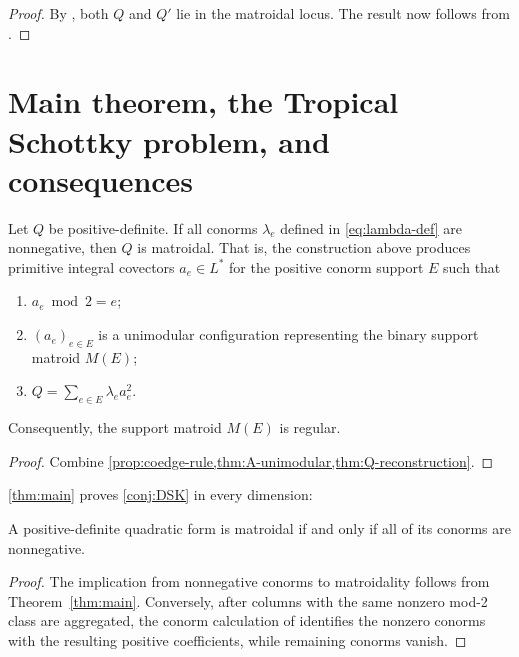 \documentclass[11pt,letterpaper]{amsart}
\begin{document}
\begin{proof}
By , both $Q$ and $Q'$ lie in
the matroidal locus. The result now follows from
\cite[Corollary~6.3]{sikiric2022iso}.
\end{proof}


\section{Main theorem, the Tropical Schottky problem, and consequences}\label{sec:main}

\begin{theorem}\label{thm:main}
Let $Q$ be positive-definite.  If all conorms $\lambda_e$ defined in \eqref{eq:lambda-def} are nonnegative, then $Q$ is matroidal.  That is, the construction above produces primitive integral covectors $a_e\in L^*$ for the positive conorm support $E$ such that
\begin{enumerate}
\item $a_e\bmod2=e$;
\item $(a_e)_{e\in E}$ is a unimodular configuration representing the binary support matroid $M(E)$;
\item $Q=\sum_{e\in E}\lambda_ea_e^2$.
\end{enumerate}
Consequently, the support matroid $M(E)$ is regular.
\end{theorem}

\begin{proof}
Combine \cref{prop:coedge-rule,thm:A-unimodular,thm:Q-reconstruction}.
\end{proof}

\cref{thm:main} proves \cref{conj:DSK} in every dimension:

\begin{corollary}
\label{cor:nonnegative-conorm-criterion}
A positive-definite quadratic form is matroidal if and only if all of its conorms are nonnegative.
\end{corollary}

\begin{proof}
The implication from nonnegative conorms to matroidality follows from Theorem~\ref{thm:main}. Conversely, after columns with the same nonzero mod-2 class are aggregated, the conorm calculation of \cite[Proposition 6.2] {sikiric2022iso} identifies the nonzero conorms with the resulting positive coefficients, while remaining conorms vanish.
\end{proof}
\end{document}
